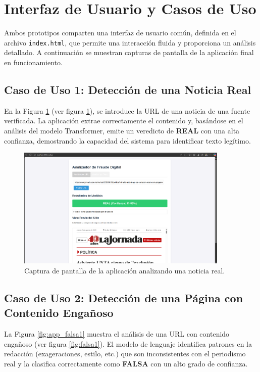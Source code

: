 \section{Interfaz de Usuario y Casos de Uso}
Ambos prototipos comparten una interfaz de usuario común, definida en el archivo \texttt{index.html}, que permite una interacción fluida y proporciona un análisis detallado. A continuación se muestran capturas de pantalla de la aplicación final en funcionamiento.

\subsection{Caso de Uso 1: Detección de una Noticia Real}
En la Figura \ref{fig:app_real} (ver figura \ref{fig:app_real}), se introduce la URL de una noticia de una fuente verificada. La aplicación extrae correctamente el contenido y, basándose en el análisis del modelo Transformer, emite un veredicto de \textbf{REAL} con una alta confianza, demostrando la capacidad del sistema para identificar texto legítimo.

\begin{figure}[htbp]
    \centering
    \includegraphics[width=0.9\textwidth]{Imagenes/app_real.png} %
    \caption{Captura de pantalla de la aplicación analizando una noticia real.}
    \label{fig:app_real}
\end{figure}

\subsection{Caso de Uso 2: Detección de una Página con Contenido Engañoso}
La Figura \ref{fig:app_falsa1} muestra el análisis de una URL con contenido engañoso (ver figura \ref{fig:falsa1}). El modelo de lenguaje identifica patrones en la redacción (exageraciones, estilo, etc.) que son inconsistentes con el periodismo real y la clasifica correctamente como \textbf{FALSA} con un alto grado de confianza.

